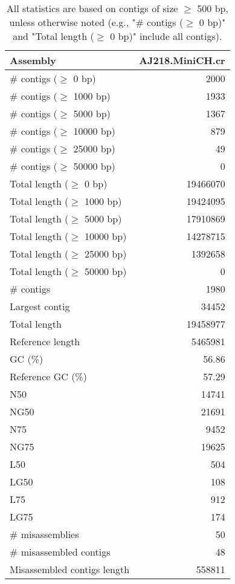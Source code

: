 \documentclass[12pt,a4paper]{article}
\begin{document}
\begin{table}[ht]
\begin{center}
\caption{All statistics are based on contigs of size $\geq$ 500 bp, unless otherwise noted (e.g., "\# contigs ($\geq$ 0 bp)" and "Total length ($\geq$ 0 bp)" include all contigs).}
\begin{tabular}{|l*{1}{|r}|}
\hline
Assembly & AJ218.MiniCH.cr \\ \hline
\# contigs ($\geq$ 0 bp) & 2000 \\ \hline
\# contigs ($\geq$ 1000 bp) & 1933 \\ \hline
\# contigs ($\geq$ 5000 bp) & 1367 \\ \hline
\# contigs ($\geq$ 10000 bp) & 879 \\ \hline
\# contigs ($\geq$ 25000 bp) & 49 \\ \hline
\# contigs ($\geq$ 50000 bp) & 0 \\ \hline
Total length ($\geq$ 0 bp) & 19466070 \\ \hline
Total length ($\geq$ 1000 bp) & 19424095 \\ \hline
Total length ($\geq$ 5000 bp) & 17910869 \\ \hline
Total length ($\geq$ 10000 bp) & 14278715 \\ \hline
Total length ($\geq$ 25000 bp) & 1392658 \\ \hline
Total length ($\geq$ 50000 bp) & 0 \\ \hline
\# contigs & 1980 \\ \hline
Largest contig & 34452 \\ \hline
Total length & 19458977 \\ \hline
Reference length & 5465981 \\ \hline
GC (\%) & 56.86 \\ \hline
Reference GC (\%) & 57.29 \\ \hline
N50 & 14741 \\ \hline
NG50 & 21691 \\ \hline
N75 & 9452 \\ \hline
NG75 & 19625 \\ \hline
L50 & 504 \\ \hline
LG50 & 108 \\ \hline
L75 & 912 \\ \hline
LG75 & 174 \\ \hline
\# misassemblies & 50 \\ \hline
\# misassembled contigs & 48 \\ \hline
Misassembled contigs length & 558811 \\ \hline

\end{tabular}
\end{center}
\end{table}
\end{document}
